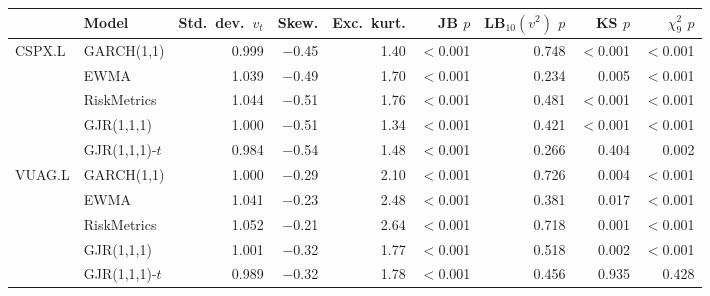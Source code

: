 \begin{tabular}{llrrrrrrr}
\toprule
 & Model & Std.\ dev.\ $v_t$ & Skew. & Exc.\ kurt. & JB $p$ & LB$_{10}(v^2)$ $p$ & KS $p$ & $\chi^2_{9}$ $p$ \\
\midrule
CSPX.L & GARCH(1,1) & 0.999 & $-$0.45 & 1.40 & $<$0.001 & 0.748 & $<$0.001 & $<$0.001 \\
 & EWMA & 1.039 & $-$0.49 & 1.70 & $<$0.001 & 0.234 & 0.005 & $<$0.001 \\
 & RiskMetrics & 1.044 & $-$0.51 & 1.76 & $<$0.001 & 0.481 & $<$0.001 & $<$0.001 \\
 & GJR(1,1,1) & 1.000 & $-$0.51 & 1.34 & $<$0.001 & 0.421 & $<$0.001 & $<$0.001 \\
 & GJR(1,1,1)-$t$ & 0.984 & $-$0.54 & 1.48 & $<$0.001 & 0.266 & 0.404 & 0.002 \\
\midrule
VUAG.L & GARCH(1,1) & 1.000 & $-$0.29 & 2.10 & $<$0.001 & 0.726 & 0.004 & $<$0.001 \\
 & EWMA & 1.041 & $-$0.23 & 2.48 & $<$0.001 & 0.381 & 0.017 & $<$0.001 \\
 & RiskMetrics & 1.052 & $-$0.21 & 2.64 & $<$0.001 & 0.718 & 0.001 & $<$0.001 \\
 & GJR(1,1,1) & 1.001 & $-$0.32 & 1.77 & $<$0.001 & 0.518 & 0.002 & $<$0.001 \\
 & GJR(1,1,1)-$t$ & 0.989 & $-$0.32 & 1.78 & $<$0.001 & 0.456 & 0.935 & 0.428 \\
\bottomrule
\end{tabular}